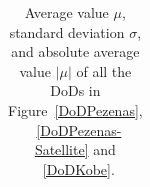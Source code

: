 \begin{table}
\begin{tabular}{||l|l|c|c|c||}
	\end{tabular}
	\caption{Average value $\mu$, standard deviation $\sigma$, and absolute average value $|\mu|$ of all the \ac{DoD}s in Figure~\ref{DoDPezenas}, ~\ref{DoDPezenas-Satellite} and ~\ref{DoDKobe}.}
	\label{RoughDoDStatistic1}
\end{table}



%		
%		
%		
